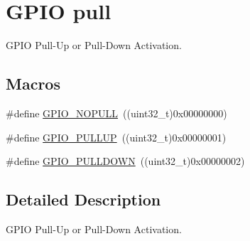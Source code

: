 \hypertarget{group___g_p_i_o__pull}{\section{G\-P\-I\-O pull}
\label{group___g_p_i_o__pull}
}


G\-P\-I\-O Pull-\/\-Up or Pull-\/\-Down Activation.  


\subsection*{Macros}
\begin{DoxyCompactItemize}
\item 
\#define \hyperlink{group___g_p_i_o__pull_ga5c2862579882c1cc64e36d38fbd07a4c}{G\-P\-I\-O\-\_\-\-N\-O\-P\-U\-L\-L}~((uint32\-\_\-t)0x00000000)
\item 
\#define \hyperlink{group___g_p_i_o__pull_gae689bc8f5c42d6df7bd54a8dd372e072}{G\-P\-I\-O\-\_\-\-P\-U\-L\-L\-U\-P}~((uint32\-\_\-t)0x00000001)
\item 
\#define \hyperlink{group___g_p_i_o__pull_ga75d958d0410c36da7f27d1f4f5c36c14}{G\-P\-I\-O\-\_\-\-P\-U\-L\-L\-D\-O\-W\-N}~((uint32\-\_\-t)0x00000002)
\end{DoxyCompactItemize}


\subsection{Detailed Description}
G\-P\-I\-O Pull-\/\-Up or Pull-\/\-Down Activation. 

